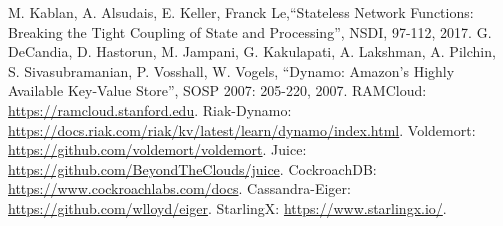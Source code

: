 \documentclass[conference]{IEEEtran}
\begin{document}
\begin{thebibliography}{00}
 M. Kablan, A. Alsudais, E. Keller, Franck Le,``Stateless Network Functions: Breaking the Tight Coupling of State and Processing'', NSDI, 97-112, 2017.
 G. DeCandia, D. Hastorun, M. Jampani, G. Kakulapati, A. Lakshman, A. Pilchin, S. Sivasubramanian, P. Vosshall, W. Vogels, ``Dynamo: Amazon's Highly Available Key-Value Store'', SOSP 2007: 205-220, 2007.
 RAMCloud: \url{https://ramcloud.stanford.edu}.
 Riak-Dynamo: \newline \url{https://docs.riak.com/riak/kv/latest/learn/dynamo/index.html}.
 Voldemort: \url{https://github.com/voldemort/voldemort}.
 Juice: \url{https://github.com/BeyondTheClouds/juice}.
 CockroachDB: \url{https://www.cockroachlabs.com/docs}.
 Cassandra-Eiger: \url{https://github.com/wlloyd/eiger}.
 StarlingX: \url{https://www.starlingx.io/}.
\end{thebibliography}
\end{document}
